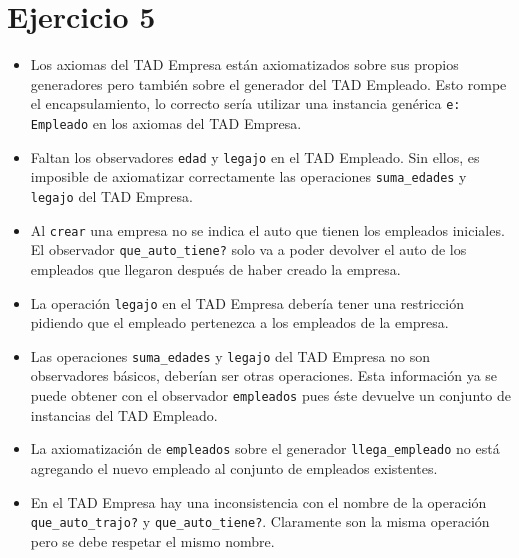 \section*{Ejercicio 5}

\begin{itemize}
    \item Los axiomas del TAD Empresa están axiomatizados sobre sus propios generadores pero también sobre el generador del TAD Empleado. Esto rompe el encapsulamiento, lo correcto sería utilizar una instancia genérica \lstinline{e: Empleado} en los axiomas del TAD Empresa.
    \item Faltan los observadores \lstinline{edad} y \lstinline{legajo} en el TAD Empleado. Sin ellos, es imposible de axiomatizar correctamente las operaciones \lstinline{suma_edades} y \lstinline{legajo} del TAD Empresa.
    \item Al \lstinline{crear} una empresa no se indica el auto que tienen los empleados iniciales. El observador \lstinline{que_auto_tiene?} solo va a poder devolver el auto de los empleados que llegaron después de haber creado la empresa.
    \item La operación \lstinline{legajo} en el TAD Empresa debería tener una restricción pidiendo que el empleado pertenezca a los empleados de la empresa.
    \item Las operaciones \lstinline{suma_edades} y \lstinline{legajo} del TAD Empresa no son observadores básicos, deberían ser otras operaciones. Esta información ya se puede obtener con el observador \lstinline{empleados} pues éste devuelve un conjunto de instancias del TAD Empleado.
    \item La axiomatización de \lstinline{empleados} sobre el generador \lstinline{llega_empleado} no está agregando el nuevo empleado al conjunto de empleados existentes.
    \item En el TAD Empresa hay una inconsistencia con el nombre de la operación \lstinline{que_auto_trajo?} y \lstinline{que_auto_tiene?}. Claramente son la misma operación pero se debe respetar el mismo nombre.
\end{itemize}
